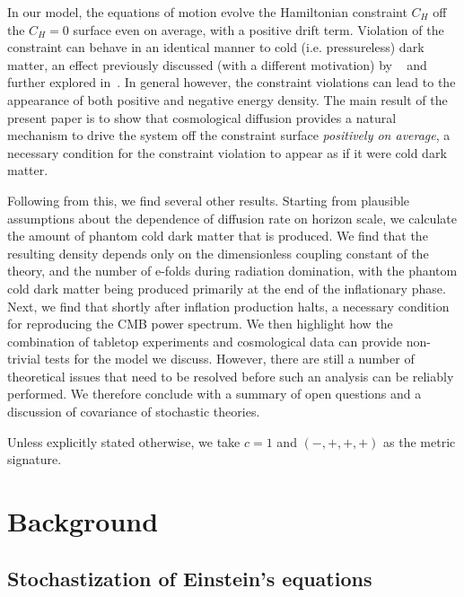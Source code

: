 \documentclass[amsmath,amssymb,11pt]{article}
\begin{document}
In our model, the equations of motion evolve the Hamiltonian constraint $C_H$ off the $C_H=0$ surface even on average, with a positive drift term. Violation of the constraint can behave in an identical manner to cold (i.e. pressureless) dark matter, an effect previously discussed (with a different motivation) by ~\cite{burns2023time,kaplan2023classical} and further explored in~\cite{casadio2024relaxation,delgrosso2024cosmological}. 
In general however, the constraint violations can lead to the appearance of both positive and negative energy density. The main result of the present paper is to show that cosmological diffusion provides a natural mechanism to drive the system off the constraint surface {\it positively on average}, a necessary condition for the constraint violation to appear as if it were cold dark matter.

Following from this, we find several other results. Starting from plausible assumptions about the dependence of diffusion rate on horizon scale, we calculate the amount of phantom cold dark matter that is produced. We find that the resulting density depends only on the dimensionless coupling constant of the theory, and the number of e-folds during radiation domination, with the phantom cold dark matter being produced primarily at the end of the inflationary phase. Next, we find that shortly after inflation production halts, a necessary condition for reproducing the CMB power spectrum. We then highlight how the combination of tabletop experiments and cosmological data can provide non-trivial tests for the model we discuss. However, there are still a number of theoretical issues that need to be resolved before such an analysis can be reliably performed. We therefore conclude with a summary of open questions and a discussion of covariance of stochastic theories.

Unless explicitly stated otherwise, we take $c=1$ and $(-,+,+,+)$ as the metric signature.

\section{Background} \label{sec:theory}
\subsection{Stochastization of Einstein's equations} 
\end{document}
